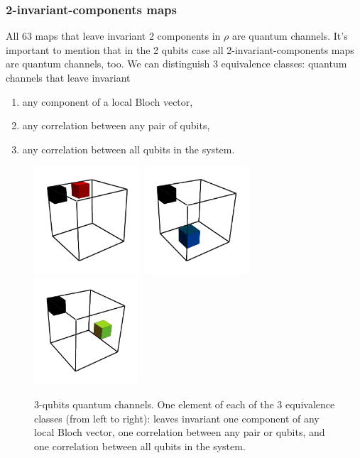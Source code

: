 \documentclass[11pt,dvipsnames]{article} %
\newcommand{\1}{\mathds{1}}
\begin{document}
\subsubsection*{2-invariant-components maps}
All 63 maps that leave invariant 2 components in $\rho$ are 
quantum channels. It's important to mention that in the 2 qubits case all 
2-invariant-components maps are quantum channels, too. We can distinguish
3 equivalence classes: quantum channels that leave invariant
\begin{enumerate}
	\item any component of a local Bloch vector,
	\item any correlation between any pair of qubits,
	\item any correlation between all qubits in the system.
\end{enumerate}
\begin{figure}[H]
	\centering
	\hfill \hfill
	\includegraphics[height=4cm]{img/3q-2c-1}
	\hfill
	\includegraphics[height=4cm]{img/3q-2c-2}
	\hfill
	\includegraphics[height=4cm]{img/3q-2c-3}
	\hfill \hfill
	\caption{3-qubits quantum channels. One element of each of the 
	3 equivalence classes 
	(from left to right): leaves invariant one component of any local
	Bloch vector, one correlation between any pair or qubits, and 
	one correlation between all qubits in the system.}
	\label{fig:QC-3q-2c}
\end{figure}
\end{document}
